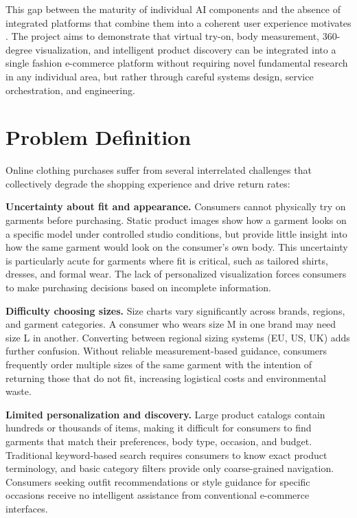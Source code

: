 This gap between the maturity of individual AI components and the absence of integrated platforms that combine them into a coherent user experience motivates \projectname. The project aims to demonstrate that virtual try-on, body measurement, 360-degree visualization, and intelligent product discovery can be integrated into a single fashion e-commerce platform without requiring novel fundamental research in any individual area, but rather through careful systems design, service orchestration, and engineering.

\section{Problem Definition}
Online clothing purchases suffer from several interrelated challenges that collectively degrade the shopping experience and drive return rates:

\textbf{Uncertainty about fit and appearance.} Consumers cannot physically try on garments before purchasing. Static product images show how a garment looks on a specific model under controlled studio conditions, but provide little insight into how the same garment would look on the consumer's own body. This uncertainty is particularly acute for garments where fit is critical, such as tailored shirts, dresses, and formal wear. The lack of personalized visualization forces consumers to make purchasing decisions based on incomplete information.

\textbf{Difficulty choosing sizes.} Size charts vary significantly across brands, regions, and garment categories. A consumer who wears size M in one brand may need size L in another. Converting between regional sizing systems (EU, US, UK) adds further confusion. Without reliable measurement-based guidance, consumers frequently order multiple sizes of the same garment with the intention of returning those that do not fit, increasing logistical costs and environmental waste.

\textbf{Limited personalization and discovery.} Large product catalogs contain hundreds or thousands of items, making it difficult for consumers to find garments that match their preferences, body type, occasion, and budget. Traditional keyword-based search requires consumers to know exact product terminology, and basic category filters provide only coarse-grained navigation. Consumers seeking outfit recommendations or style guidance for specific occasions receive no intelligent assistance from conventional e-commerce interfaces.

